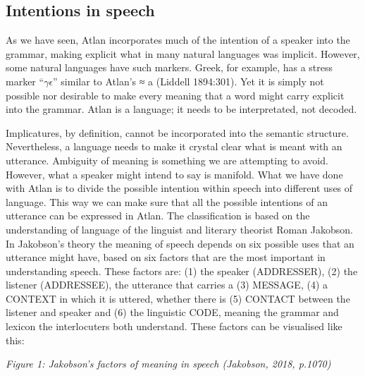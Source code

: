\vspace{-0.2cm}
\subsection{Intentions in speech}

As we have seen, Atlan incorporates much of the intention of a speaker into the grammar, making explicit what in many natural languages was implicit. However, some natural languages have such markers. Greek, for example, has a stress marker “$\gamma\epsilon$” similar to Atlan’s \Atlana ≈ a (Liddell 1894:301). Yet it is simply not possible nor desirable to make every meaning that a word might carry explicit into the grammar. Atlan is a language; it needs to be interpretated, not decoded.

Implicatures, by definition, cannot be incorporated into the semantic structure. Nevertheless, a language needs to make it crystal clear what is meant with an utterance. Ambiguity of meaning is something we are attempting to avoid. However, what a speaker might intend to say is manifold. What we have done with Atlan is to divide the possible intention within speech into different uses of language. This way we can make sure that all the possible intentions of an utterance can be expressed in Atlan. The classification is based on the understanding of language of the linguist and literary theorist Roman Jakobson. In Jakobson's theory the meaning of speech depends on six possible uses that an utterance might have, based on six factors that are the most important in understanding speech. These factors are: (1) the speaker (ADDRESSER), (2) the listener (ADDRESSEE), the utterance that carries  a (3) MESSAGE, (4) a CONTEXT in which it is uttered, whether there is (5) CONTACT between the listener and speaker and (6) the linguistic CODE, meaning the grammar and lexicon the interlocuters both understand. These factors can be visualised like this:

\small
{}
\normalsize

\vspace{-.1cm}
{\it \footnotesize Figure 1: Jakobson's factors of meaning in speech (Jakobson, 2018, p.1070)}
\vspace{0.3cm}

